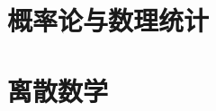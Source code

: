 \documentclass[10pt,a4paper,nofonts]{ctexart}
\newcommand{\<}{\langle}
\renewcommand{\>}{\rangle}
\begin{document}
\section*{概率论与数理统计}

\newpage
\setcounter{subsection}{0}
\section*{离散数学}

\end{document}
